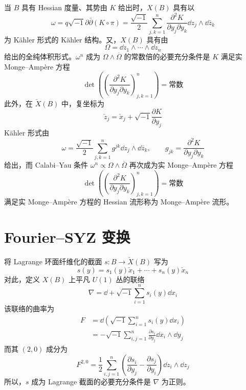 当 $B$ 具有 Hessian 度量、其势由 $K$ 给出时，$X(B)$ 具有以
\begin{equation}
  \omega = q\sqrt{-1}\partial\bar\partial(K\circ\pi)
  = \frac{\sqrt{-1}}{2}\sum_{j,k=1}^{n}
  \frac{\partial^2 K}{\partial y_j\partial y_k}\dd z_j\wedge \dd\bar z_k \tag{28.2}
\end{equation}
为 Kähler 形式的 Kähler 结构。又，$X(B)$ 具有由
\begin{equation}
  \Omega = \dd z_1\wedge\cdots\wedge \dd z_n \tag{28.3}
\end{equation}
给出的全纯体积形式。$\omega^n$ 成为 $\Omega\wedge\overline{\Omega}$ 的常数倍的必要充分条件是 $K$ 满足实 Monge–Ampère 方程
\begin{equation}
  \det\left(\left(\frac{\partial^2 K}{\partial y_j\partial y_k}\right)_{j,k=1}^{n}\right)
  = \text{常数} \tag{28.4}
\end{equation}
此外，在 $\check X(B)$ 中，复坐标为
\begin{equation}
  \check z_j = \check x_j + \sqrt{-1}\frac{\partial K}{\partial y_j} \tag{28.5}
\end{equation}
Kähler 形式由
\begin{equation}
  \omega = \frac{\sqrt{-1}}{2}\sum_{j,k=1}^{n} g^{jk}\dd z_j\wedge \dd\bar z_k,
  \qquad g_{jk} = \frac{\partial^2 K}{\partial y_j\partial y_k} \tag{28.6}
\end{equation}
给出，而 Calabi–Yau 条件 $\omega^n \propto \Omega\wedge\overline{\Omega}$ 再次成为实 Monge–Ampère 方程
\begin{equation}
  \det\left(\left(\frac{\partial^2 K}{\partial y_j\partial y_k}\right)_{j,k=1}^{n}\right)
  = \text{常数} \tag{28.7}
\end{equation}
满足实 Monge–Ampère 方程的 Hessian 流形称为 Monge–Ampère 流形。

\section{Fourier–SYZ 变换}

将 Lagrange 环面纤维化的截面 $s: B \to \check X(B)$ 写为
\begin{equation}
  s(y) = s_1(y)\check x_1 + \cdots + s_n(y)\check x_n \tag{29.1}
\end{equation}
对此，定义 $X(B)$ 上平凡 $U(1)$ 丛的联络
\begin{equation}
  \nabla = \dd + \sqrt{-1}\sum_{i=1}^{n}s_i(y)\dd x_i \tag{29.2}
\end{equation}
该联络的曲率为
\begin{align}
  F &= \dd\left(\sqrt{-1}\sum_{i=1}^{n}s_i(y)\dd x_i\right) \tag{29.3}\\
  &= -\sqrt{-1}\sum_{i,j=1}^{n}\frac{\partial s_i}{\partial y_j}
    \dd x_i\wedge \dd y_j \tag{29.4}
\end{align}
而其 $(2,0)$ 成分为
\begin{equation}
  F^{2,0} = \frac{1}{2}\sum_{i,j=1}^{n}
  \left(\frac{\partial s_i}{\partial y_j} - \frac{\partial s_j}{\partial y_i}\right)
  \dd z_i\wedge \dd z_j \tag{29.5}
\end{equation}
所以，$s$ 成为 Lagrange 截面的必要充分条件是 $\nabla$ 为正则。

